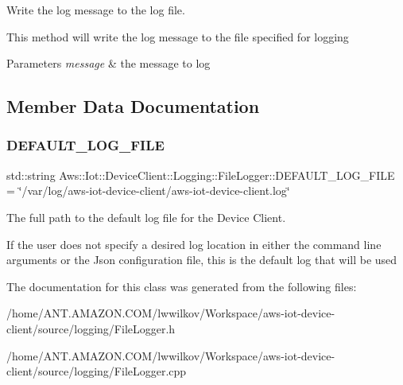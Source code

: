 Write the log message to the log file. 

This method will write the log message to the file specified for logging 
\begin{DoxyParams}{Parameters}
{\em message} & the message to log \\
\hline
\end{DoxyParams}


\subsection{Member Data Documentation}
\mbox{\label{class_aws_1_1_iot_1_1_device_client_1_1_logging_1_1_file_logger_a771b31b2f05b4f8fa29de755f15eb35c}} 
\subsubsection{\texorpdfstring{D\+E\+F\+A\+U\+L\+T\+\_\+\+L\+O\+G\+\_\+\+F\+I\+LE}{DEFAULT\_LOG\_FILE}}
{\footnotesize\ttfamily std\+::string Aws\+::\+Iot\+::\+Device\+Client\+::\+Logging\+::\+File\+Logger\+::\+D\+E\+F\+A\+U\+L\+T\+\_\+\+L\+O\+G\+\_\+\+F\+I\+LE = \char`\"{}/var/log/aws-\/iot-\/device-\/client/aws-\/iot-\/device-\/client.\+log\char`\"{}\hspace{0.3cm}{\ttfamily [private]}}



The full path to the default log file for the Device Client. 

If the user does not specify a desired log location in either the command line arguments or the Json configuration file, this is the default log that will be used 

The documentation for this class was generated from the following files\+:\begin{DoxyCompactItemize}
\item 
/home/\+A\+N\+T.\+A\+M\+A\+Z\+O\+N.\+C\+O\+M/lwwilkov/\+Workspace/aws-\/iot-\/device-\/client/source/logging/File\+Logger.\+h\item 
/home/\+A\+N\+T.\+A\+M\+A\+Z\+O\+N.\+C\+O\+M/lwwilkov/\+Workspace/aws-\/iot-\/device-\/client/source/logging/File\+Logger.\+cpp\end{DoxyCompactItemize}
